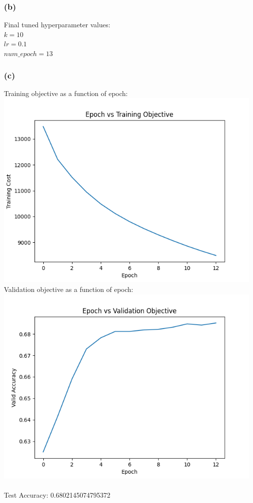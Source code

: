 \documentclass{article}
\begin{document}
\subsubsection{(b)}
Final tuned hyperparameter values:\\
$k = 10$\\
$lr = 0.1$\\
$num\_epoch = 13$
\subsubsection{(c)}
Training objective as a function of epoch:\\
\includegraphics[scale=0.6]{figures/Aq3_train_objective_plot.png}\\
Validation objective as a function of epoch:\\
\includegraphics[scale=0.6]{figures/Aq3_valid_objective_plot.png}\\
\\
Test Accuracy: 0.6802145074795372
\end{document}
